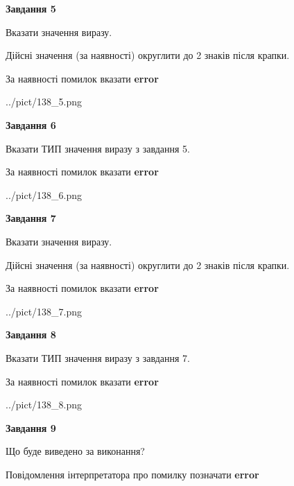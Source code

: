 \documentclass[11pt, ukrainian]{article}
\begin{document}
{\begin {large}
{\begin {center}\textbf{Завдання 5}\end {center}}\par
Вказати значення виразу. \par
Дійсні значення (за наявності) округлити до 2 знаків після крапки. \par
За наявності помилок вказати \textbf{error}

\begin{center}
	{../pict/138_5.png}
\end{center}
\newpage

{\begin {center}\textbf{Завдання 6}\end {center}}\par
Вказати ТИП значення виразу з завдання 5. \par
За наявності помилок вказати \textbf{error}

\begin{center}
	{../pict/138_6.png}
\end{center}
\newpage

{\begin {center}\textbf{Завдання 7}\end {center}}\par
Вказати значення виразу. \par
Дійсні значення (за наявності) округлити до 2 знаків після крапки. \par
За наявності помилок вказати \textbf{error}

\begin{center}
	{../pict/138_7.png}
\end{center}
\newpage

{\begin {center}\textbf{Завдання 8}\end {center}}\par
Вказати ТИП значення виразу з завдання 7. \par
За наявності помилок вказати \textbf{error}

\begin{center}
	{../pict/138_8.png}
\end{center}
\newpage

{\begin {center}\textbf{Завдання 9}\end {center}}\par
Що буде виведено за виконання? \par
Повідомлення інтерпретатора про помилку позначати \textbf{error}


\end{large}}
\end{document}
